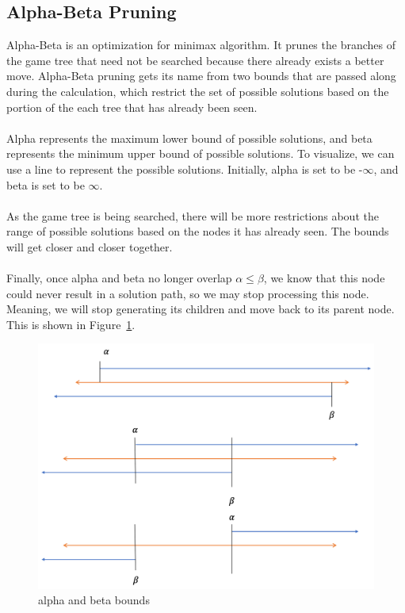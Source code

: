 \subsection{Alpha-Beta Pruning}
Alpha-Beta is an optimization for minimax algorithm. It prunes the branches of the game tree that need not be searched because there already exists a better move. Alpha-Beta pruning gets its name from two bounds that are passed along during the calculation, which restrict the set of possible solutions based on the portion of the each tree that has already been seen.\\
\\
Alpha represents the maximum lower bound of possible solutions, and beta represents the minimum upper bound of possible solutions. To visualize, we can use a line to represent the possible solutions. Initially, alpha is set to be -$\infty$, and beta is set to be $\infty$. \\
\\
As the game tree is being searched, there will be more restrictions about the range of possible solutions based on the nodes it has already seen. The bounds will get closer and closer together.\\
\\
Finally, once alpha and beta no longer overlap \(\alpha\leq\beta\), we know that this node could never result in a solution path, so we may stop processing this node. Meaning, we will stop generating its children and move back to its parent node. This is shown in Figure~\ref{fig:alpha-beta}.\\

\begin{figure}[!htbp]
    \centering
    \includegraphics[scale=0.3]{images/ab.png}
    \caption{alpha and beta bounds}
    \label{fig:alpha-beta}
\end{figure}

